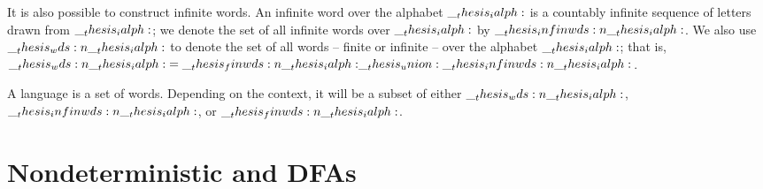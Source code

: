 It is also possible to construct infinite words.
An infinite word over the alphabet $\__thesis_ialph:$ is a countably infinite sequence of letters drawn from $\__thesis_ialph:$;
we denote the set of all infinite words over $\__thesis_ialph:$ by $\__thesis_infinwds:n {\__thesis_ialph:}$.
We also use $\__thesis_wds:n {\__thesis_ialph:}$ to denote the set of all words -- finite or infinite -- over the alphabet $\__thesis_ialph:$; that is, $\__thesis_wds:n {\__thesis_ialph:} = \__thesis_finwds:n {\__thesis_ialph:} \__thesis_union: \__thesis_infinwds:n {\__thesis_ialph:}$.

A language is a set of words.
Depending on the context, it will be a subset of either $\__thesis_wds:n {\__thesis_ialph:}$, $\__thesis_infinwds:n {\__thesis_ialph:}$, or $\__thesis_finwds:n {\__thesis_ialph:}$.




\section{Nondeterministic and \aclp*{DFA}}

